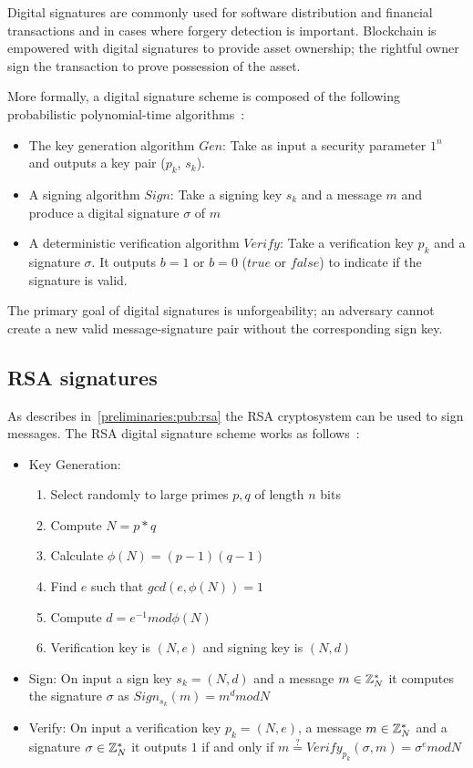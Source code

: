 Digital signatures are commonly used for software distribution and financial transactions and in cases where forgery detection is important. Blockchain is empowered with digital signatures to provide asset ownership; the rightful owner sign the transaction to prove possession of the asset.

More formally, a digital signature scheme is composed of the following probabilistic polynomial-time algorithms~\cite{Katz:2014:IMC:2700550,kiagias:crypto}:

\begin{itemize}
  \item The key generation algorithm $Gen$: Take as input a security parameter $1^{n}$ and outputs a key pair ($p_k$, $s_k$).
  \item A signing algorithm $Sign$: Take a signing key $s_k$ and a message $m$ and produce a digital signature $\sigma$ of $m$
  \item A deterministic verification algorithm $Verify$: Take a verification key $p_k$ and a signature $\sigma$. It outputs $b=1$ or $b=0$ ($true$ or $false$) to indicate if the signature is valid.
\end{itemize}

The primary goal of digital signatures is unforgeability; an adversary cannot create a new valid message-signature pair without the corresponding sign key.

\subsection{RSA signatures}
\label{preliminaries:sign:rsa}

As describes in~\ref{preliminaries:pub:rsa} the RSA cryptosystem can be used to sign messages. The RSA digital signature scheme works as follows~\cite{Katz:2014:IMC:2700550, kiagias:crypto}:

\begin{itemize}
  \item Key Generation:
    \begin{enumerate}
      \item Select randomly to large primes $p, q$ of length $n$ bits
      \item Compute $N = p*q$
      \item Calculate $\phi(N) = (p - 1)(q - 1)$
      \item Find $e$ such that $gcd(e, \phi(N)) = 1$
      \item Compute $d = e^{-1} mod\phi(N)$
      \item Verification key is $(N, e)$ and signing key is $(N, d)$
    \end{enumerate}
  \item Sign: On input a sign key $s_k = (N, d)$ and a message $m \in \mathbb{Z}^{*}_{N}$ it computes the signature $\sigma$ as $ Sign_{s_k}(m) = m^{d}modN$
  \item Verify: On input a verification key $p_k = (N, e)$, a message $m \in \mathbb{Z}^{*}_{N}$ and a signature $\sigma \in \mathbb{Z}^{*}_{N}$ it outputs $1$ if and only if $m \stackrel{?}{=} Verify_{p_k}(\sigma, m) = \sigma^{e}modN$
\end{itemize}

